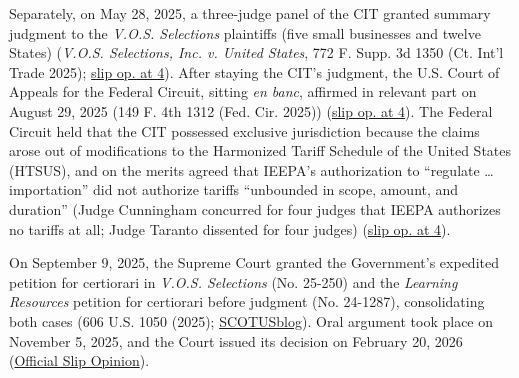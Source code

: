 \documentclass[12pt]{article}
\begin{document}
Separately, on May 28, 2025, a three-judge panel of the CIT granted summary judgment to the \textit{V.O.S. Selections} plaintiffs (five small businesses and twelve States) (\textit{V.O.S. Selections, Inc. v. United States}, 772 F. Supp. 3d 1350 (Ct. Int'l Trade 2025); \href{https://www.law.cornell.edu/supremecourt/text/24-1287}{slip op. at 4}). After staying the CIT's judgment, the U.S. Court of Appeals for the Federal Circuit, sitting \textit{en banc}, affirmed in relevant part on August 29, 2025 (149 F. 4th 1312 (Fed. Cir. 2025)) (\href{https://www.law.cornell.edu/supremecourt/text/24-1287}{slip op. at 4}). The Federal Circuit held that the CIT possessed exclusive jurisdiction because the claims arose out of modifications to the Harmonized Tariff Schedule of the United States (HTSUS), and on the merits agreed that IEEPA's authorization to ``regulate \ldots{} importation'' did not authorize tariffs ``unbounded in scope, amount, and duration'' (Judge Cunningham concurred for four judges that IEEPA authorizes no tariffs at all; Judge Taranto dissented for four judges) (\href{https://www.law.cornell.edu/supremecourt/text/24-1287}{slip op. at 4}).

On September 9, 2025, the Supreme Court granted the Government's expedited petition for certiorari in \textit{V.O.S. Selections} (No. 25-250) and the \textit{Learning Resources} petition for certiorari before judgment (No. 24-1287), consolidating both cases (606 U.S. 1050 (2025); \href{https://www.scotusblog.com/cases/learning-resources-inc-v-trump/}{SCOTUSblog}). Oral argument took place on November 5, 2025, and the Court issued its decision on February 20, 2026 (\href{https://www.supremecourt.gov/opinions/25pdf/24-1287_4gcj.pdf}{Official Slip Opinion}).
\end{document}

